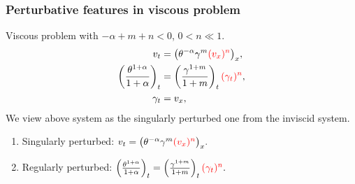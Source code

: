 \documentclass{beamer}
\def\red{\color{red}}
\def\blue{\color{blue}}
\begin{document}
%       
%       
%       
%       

\begin{frame}
 \frametitle{Perturbative features in viscous problem}
 Viscous problem with {\scriptsize {\red $-\alpha +m+n<0$}, $0<n\ll1$.}
 \begin{align*}
  v_t &= \big(\theta^{-\alpha}\gamma^m {\red (v_x)^n}\big)_x,\\
  \left(\frac{\theta^{1+\alpha}}{1+\alpha}\right)_t &= \left(\frac{\gamma^{1+m}}{1+m}\right)_t{\red (\gamma_t)^n},\\
  \gamma_t&=v_x,
 \end{align*}
 We view above system as the singularly perturbed one from the inviscid system.
  \vfill
 \begin{enumerate}
  \item Singularly perturbed:
  $v_t = \big(\theta^{-\alpha}\gamma^m {\red (v_x)^n}\big)_x.$
  \item Regularly perturbed:
  $ \left(\frac{\theta^{1+\alpha}}{1+\alpha}\right)_t = \left(\frac{\gamma^{1+m}}{1+m}\right)_t{\red (\gamma_t)^n}.$
 \end{enumerate}
\end{frame}
\end{document}
